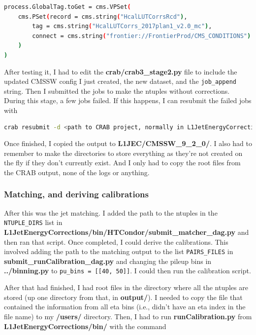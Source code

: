 \begin{lstlisting}[belowskip=-0.7cm, language=sh, numbers=none]
process.GlobalTag.toGet = cms.VPSet(
    cms.PSet(record = cms.string("HcalLUTCorrsRcd"),
        tag = cms.string("HcalLUTCorrs_2017plan1_v2.0_mc"),
        connect = cms.string("frontier://FrontierProd/CMS_CONDITIONS")
    )
)
\end{lstlisting}

After testing it, I had to edit the \textbf{crab/crab3\_stage2.py} file to include the updated CMSSW config I just created, the new dataset, and the \texttt{job\_append} string. Then I submitted the jobs to make the ntuples without corrections. During this stage, a few jobs failed. If this happens, I can resubmit the failed jobs with

\begin{lstlisting}[belowskip=-0.7cm, language=sh, numbers=none]
crab resubmit -d <path to CRAB project, normally in L1JetEnergyCorrections/crab/ directory>
\end{lstlisting}

Once finished, I copied the output to \textbf{L1JEC/CMSSW\_9\_2\_0/}. I also had to remember to make the directories to store everything as they're not created on the fly if they don't currently exist. And I only had to copy the root files from the CRAB output, none of the logs or anything.


\subsubsection{Matching, and deriving calibrations}

After this was the jet matching. I added the path to the ntuples in the \texttt{NTUPLE\_DIRS} list in \textbf{L1JetEnergyCorrections/bin/HTCondor/submit\_matcher\_dag.py} and then ran that script. Once completed, I could derive the calibrations. This involved adding the path to the matching output to the list \texttt{PAIRS\_FILES} in \textbf{submit\_runCalibration\_dag.py} and changing the pileup bins in \textbf{../binning.py} to \texttt{pu\_bins = [[40, 50]]}. I could then run the calibration script.

After that had finished, I had root files in the directory where all the ntuples are stored (up one directory from that, in \textbf{output/}). I needed to copy the file that contained the information from all eta bins (i.e., didn't have an eta index in the file name) to my \textbf{/users/} directory. Then, I had to run \textbf{runCalibration.py} from \textbf{L1JetEnergyCorrections/bin/} with the command

